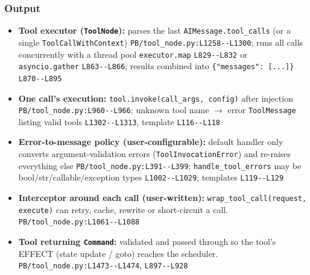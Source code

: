 \subsubsection*{Output}
\begin{itemize}
\item \textbf{Tool executor (\texttt{ToolNode}):} parses the last \texttt{AIMessage.\allowbreak{}tool\_\allowbreak{}calls} (or a single \texttt{ToolCallWithContext}) \texttt{PB/\allowbreak{}tool\_\allowbreak{}node.\allowbreak{}py:\allowbreak{}L1258-\allowbreak{}-\allowbreak{}L1300}; runs all calls concurrently with a thread pool \texttt{executor.\allowbreak{}map} \texttt{L829-\allowbreak{}-\allowbreak{}L832} or \texttt{asyncio.\allowbreak{}gather} \texttt{L863-\allowbreak{}-\allowbreak{}L866}; results combined into \texttt{\{"messages":\allowbreak{} [.\allowbreak{}.\allowbreak{}.\allowbreak{}]\}} \texttt{L870-\allowbreak{}-\allowbreak{}L895}
\item \textbf{One call's execution:} \texttt{tool.\allowbreak{}invoke(\allowbreak{}call\_\allowbreak{}args, config)} after injection \texttt{PB/\allowbreak{}tool\_\allowbreak{}node.\allowbreak{}py:\allowbreak{}L960-\allowbreak{}-\allowbreak{}L966}; unknown tool name $\rightarrow$ error \texttt{ToolMessage} listing valid tools \texttt{L1302-\allowbreak{}-\allowbreak{}L1313}, template \texttt{L116-\allowbreak{}-\allowbreak{}L118}
\item \textbf{Error-to-message policy (user-configurable):} default handler only converts argument-validation errors (\texttt{ToolInvocationError}) and re-raises everything else \texttt{PB/\allowbreak{}tool\_\allowbreak{}node.\allowbreak{}py:\allowbreak{}L391-\allowbreak{}-\allowbreak{}L399}; \texttt{handle\_\allowbreak{}tool\_\allowbreak{}errors} may be bool/str/callable/exception types \texttt{L1002-\allowbreak{}-\allowbreak{}L1029}; templates \texttt{L119-\allowbreak{}-\allowbreak{}L129}
\item \textbf{Interceptor around each call (user-written):} \texttt{wrap\_\allowbreak{}tool\_\allowbreak{}call(\allowbreak{}request, execute)} can retry, cache, rewrite or short-circuit a call. \texttt{PB/\allowbreak{}tool\_\allowbreak{}node.\allowbreak{}py:\allowbreak{}L1061-\allowbreak{}-\allowbreak{}L1088}
\item \textbf{Tool returning \texttt{Command}:} validated and passed through so the tool's EFFECT (state update / goto) reaches the scheduler. \texttt{PB/\allowbreak{}tool\_\allowbreak{}node.\allowbreak{}py:\allowbreak{}L1473-\allowbreak{}-\allowbreak{}L1474}, \texttt{L897-\allowbreak{}-\allowbreak{}L928}

\end{itemize}
